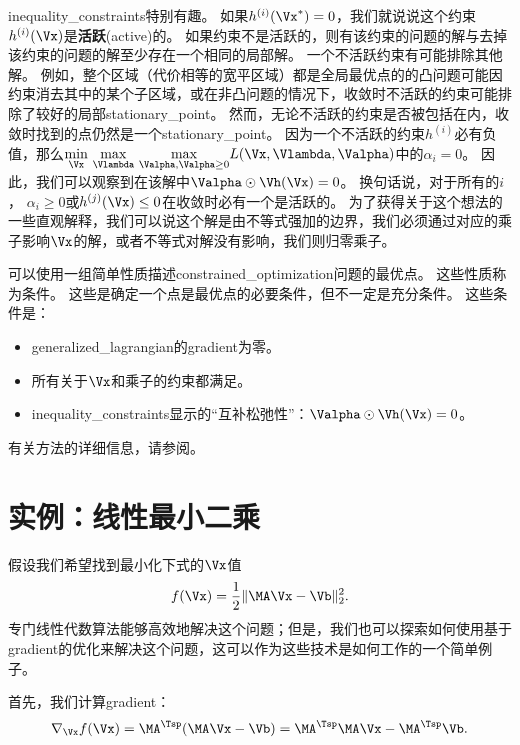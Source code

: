 \gls{inequality_constraints}特别有趣。
如果$h^{(i)}(\Vx^*)= 0$，我们就说说这个约束$h^{(i)}(\Vx)$是\textbf{活跃}(active)的。
如果约束不是活跃的，则有该约束的问题的解与去掉该约束的问题的解至少存在一个相同的局部解。
一个不活跃约束有可能排除其他解。
例如，整个区域（代价相等的宽平区域）都是全局最优点的的凸问题可能因约束消去其中的某个子区域，或在非凸问题的情况下，收敛时不活跃的约束可能排除了较好的局部\gls{stationary_point}。
然而，无论不活跃的约束是否被包括在内，收敛时找到的点仍然是一个\gls{stationary_point}。
因为一个不活跃的约束$h^{(i)}$必有负值，那么$
 \underset{\Vx}{\min}~  \underset{\Vlambda}{\max}~
 \underset{\Valpha, \Valpha \geq 0}{\max}   L(\Vx, \Vlambda, \Valpha) 
$中的$\alpha_i = 0$。
因此，我们可以观察到在该解中$\Valpha \odot \Vh(\Vx) = 0$。
换句话说，对于所有的$i$， $\alpha_i \geq 0$或$ h^{(j)}(\Vx) \leq 0$在收敛时必有一个是活跃的。
为了获得关于这个想法的一些直观解释，我们可以说这个解是由不等式强加的边界，我们必须通过对应的乘子影响$\Vx$的解，或者不等式对解没有影响，我们则归零乘子。

可以使用一组简单性质描述\gls{constrained_optimization}问题的最优点。
这些性质称为条件\citep{Karush39,kuhn1951}。
这些是确定一个点是最优点的必要条件，但不一定是充分条件。
这些条件是：
\begin{itemize}
 \item \gls{generalized_lagrangian}的\gls{gradient}为零。
 \item 所有关于$\Vx$和乘子的约束都满足。
 \item \gls{inequality_constraints}显示的``互补松弛性''：$\Valpha \odot \Vh(\Vx) = 0$。
\end{itemize}
有关方法的详细信息，请参阅\cite{NumOptBook}。


\section{实例：线性最小二乘}
\label{sec:example_linear_least_squares}
假设我们希望找到最小化下式的$\Vx$值
\begin{align}
 f(\Vx) = \frac{1}{2}\| \MA \Vx - \Vb \|_2^2 .
\end{align}
专门线性代数算法能够高效地解决这个问题；但是，我们也可以探索如何使用基于\gls{gradient}的优化来解决这个问题，这可以作为这些技术是如何工作的一个简单例子。

首先，我们计算\gls{gradient}：
\begin{align}
 \nabla_{\Vx} f(\Vx) = \MA^\Tsp (\MA \Vx - \Vb) = \MA^\Tsp \MA \Vx - \MA^\Tsp \Vb .
\end{align}

